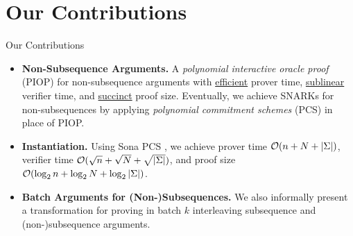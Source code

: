 \section{Our Contributions}
\begin{frame}{Our Contributions}
	\begin{itemize}
		\item \textbf{Non-Subsequence Arguments.} A \textit{polynomial interactive oracle proof} (PIOP) for non-subsequence arguments with \underline{efficient} prover time, \underline{sublinear} verifier time, and \underline{succinct} proof size. Eventually, we achieve SNARKs for non-subsequences by applying \textit{polynomial commitment schemes} (PCS) in place of PIOP.
		
		\item \textbf{Instantiation.} Using Sona PCS \cite{EC:SetThaWah23b}, we achieve prover time $\mathcal{O}(n + N + \left|\Sigma\right|)$, verifier time $\mathcal{O}(\sqrt{n} + \sqrt{N} + \sqrt{\left|\Sigma\right|})$, and proof size $\mathcal{O}(\log_2 n + \log_2 N + \log_2 \left|\Sigma\right|)$.
		
		\item \textbf{Batch Arguments for (Non-)Subsequences.} We also informally present a transformation for proving in batch $k$ interleaving subsequence and (non-)subsequence arguments.
	\end{itemize}
\end{frame}